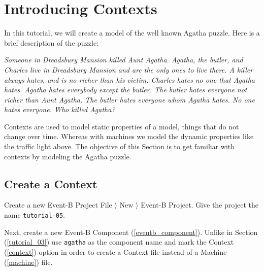 \section{Introducing Contexts}
\label{tutorial_05}


In this tutorial, we will create a model of the well known Agatha puzzle. Here is a brief description of the puzzle:

\textit{Someone in Dreadsbury Mansion killed Aunt Agatha. Agatha, the butler, and Charles live in Dreadsbury Mansion and are the only ones to live there. A killer always hates, and is no richer than his victim. Charles hates no one that Agatha hates. Agatha hates everybody except the butler. The butler hates everyone not richer than Aunt Agatha. The butler hates everyone whom Agatha hates. No one hates everyone. Who killed Agatha?}

Contexts are used to model static properties of a model, things that do not change over time. Whereas with machines we model the dynamic properties like the traffic light above.
The objective of this Section is to get familiar with contexts by modeling the Agatha puzzle.

\subsection{Create a Context}

Create a new Event-B Project \textsf{File $\rangle$ New $\rangle$ Event-B Project}. Give the project the name \texttt{tutorial-05}. 

Next, create a new Event-B Component (\ref{eventb_component}). Unlike in Section (\ref{tutorial_03}) use \texttt{agatha} as the component name and mark the \textsf{Context} (\ref{context}) option in order to create a Context file instead of a Machine (\ref{machine}) file.


